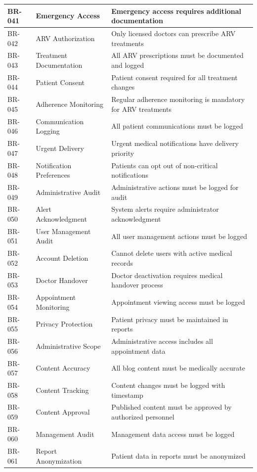 \documentclass[12pt,a4paper]{article}
\begin{document}
\begin{longtable}{|p{2cm}|p{3cm}|p{9cm}|}
\hline
BR-041 & Emergency Access & Emergency access requires additional documentation \\
\hline
BR-042 & ARV Authorization & Only licensed doctors can prescribe ARV treatments \\
\hline
BR-043 & Treatment Documentation & All ARV prescriptions must be documented and logged \\
\hline
BR-044 & Patient Consent & Patient consent required for all treatment changes \\
\hline
BR-045 & Adherence Monitoring & Regular adherence monitoring is mandatory for ARV treatments \\
\hline
BR-046 & Communication Logging & All patient communications must be logged \\
\hline
BR-047 & Urgent Delivery & Urgent medical notifications have delivery priority \\
\hline
BR-048 & Notification Preferences & Patients can opt out of non-critical notifications \\
\hline
BR-049 & Administrative Audit & Administrative actions must be logged for audit \\
\hline
BR-050 & Alert Acknowledgment & System alerts require administrator acknowledgment \\
\hline
BR-051 & User Management Audit & All user management actions must be logged \\
\hline
BR-052 & Account Deletion & Cannot delete users with active medical records \\
\hline
BR-053 & Doctor Handover & Doctor deactivation requires medical handover process \\
\hline
BR-054 & Appointment Monitoring & Appointment viewing access must be logged \\
\hline
BR-055 & Privacy Protection & Patient privacy must be maintained in reports \\
\hline
BR-056 & Administrative Scope & Administrative access includes all appointment data \\
\hline
BR-057 & Content Accuracy & All blog content must be medically accurate \\
\hline
BR-058 & Content Tracking & Content changes must be logged with timestamp \\
\hline
BR-059 & Content Approval & Published content must be approved by authorized personnel \\
\hline
BR-060 & Management Audit & Management data access must be logged \\
\hline
BR-061 & Report Anonymization & Patient data in reports must be anonymized \\

\end{longtable}
\end{document}
